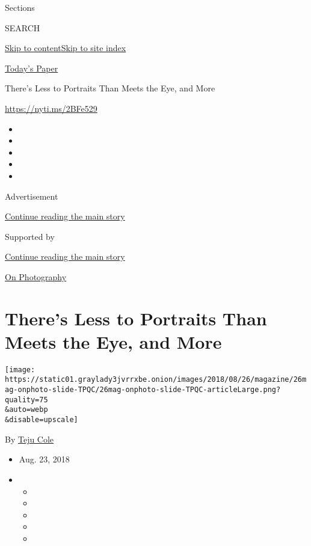 Sections

SEARCH

\protect\hyperlink{site-content}{Skip to
content}\protect\hyperlink{site-index}{Skip to site index}

\href{https://myaccount.nytimes3xbfgragh.onion/auth/login?response_type=cookie\&client_id=vi}{}

\href{https://www.nytimes3xbfgragh.onion/section/todayspaper}{Today's
Paper}

There's Less to Portraits Than Meets the Eye, and More

\url{https://nyti.ms/2BFe529}

\begin{itemize}
\item
\item
\item
\item
\item
\end{itemize}

Advertisement

\protect\hyperlink{after-top}{Continue reading the main story}

Supported by

\protect\hyperlink{after-sponsor}{Continue reading the main story}

\href{/column/on-photography}{On Photography}

\hypertarget{theres-less-to-portraits-than-meets-the-eye-and-more}{%
\section{There's Less to Portraits Than Meets the Eye, and
More}\label{theres-less-to-portraits-than-meets-the-eye-and-more}}

\texttt{[image: https://static01.graylady3jvrrxbe.onion/images/2018/08/26/magazine/26mag-onphoto-slide-TPQC/26mag-onphoto-slide-TPQC-articleLarge.png?quality=75\\\&auto=webp\\\&disable=upscale]}

By \href{https://www.nytimes3xbfgragh.onion/by/teju-cole}{Teju Cole}

\begin{itemize}
\item
  Aug. 23, 2018
\item
  \begin{itemize}
  \item
  \item
  \item
  \item
  \item
  \end{itemize}
\end{itemize}

